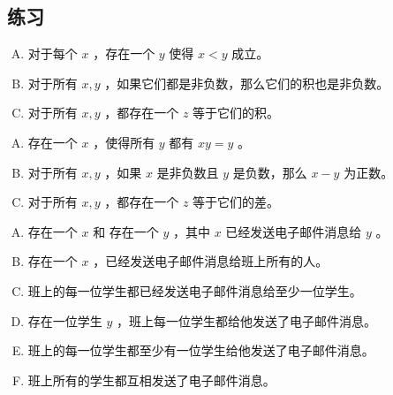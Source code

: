     \subsection{练习}
    {
        \begin{practices}
            \begin{enumerate}[A.]
                \item 对于每个 $x$ ，存在一个 $y$ 使得 $x < y$ 成立。
                \item 对于所有 $x, y$ ，如果它们都是非负数，那么它们的积也是非负数。
                \item 对于所有 $x, y$ ，都存在一个 $z$ 等于它们的积。
            \end{enumerate}
        \end{practices}

        \begin{practices}
            \begin{enumerate}[A.]
                \item 存在一个 $x$ ，使得所有 $y$ 都有 $xy = y$ 。
                \item 对于所有 $x, y$ ，如果 $x$ 是非负数且 $y$ 是负数，那么 $x - y$ 为正数。
                \item 对于所有 $x, y$ ，都存在一个 $z$ 等于它们的差。
            \end{enumerate}
        \end{practices}

        \begin{practices}
            \begin{enumerate}[A.]
                \item 存在一个 $x$ 和 存在一个 $y$ ，其中 $x$ 已经发送电子邮件消息给 $y$ 。
                \item 存在一个 $x$ ，已经发送电子邮件消息给班上所有的人。
                \item 班上的每一位学生都已经发送电子邮件消息给至少一位学生。
                \item 存在一位学生 $y$ ，班上每一位学生都给他发送了电子邮件消息。
                \item 班上的每一位学生都至少有一位学生给他发送了电子邮件消息。
                \item 班上所有的学生都互相发送了电子邮件消息。
            \end{enumerate}
        \end{practices}

}
